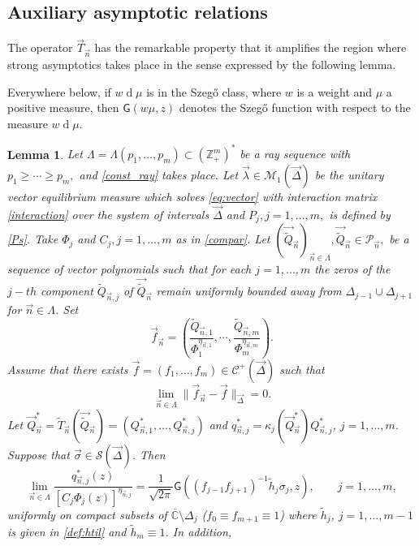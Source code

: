 \documentclass{amsart}
\numberwithin{equation}{section}
\newtheorem{lemma}[theorem]{Lemma}
\theoremstyle{definition}
\DeclareMathOperator{\D}{d}        %
\newcommand{\ZZ}{\mathbb{Z}}      %
\newcommand{\CC}{\mathbb{C}}      %
\newcommand{\n}{\vec{n}}          %
\begin{document}
\subsection{Auxiliary asymptotic relations}
The operator $\vec{T}_{\n}$ has the remarkable property that it amplifies the region where strong asymptotics takes place in the sense expressed by the following lemma.

Everywhere below, if $w \D \mu $ is in the Szeg\H{o} class, where $w$ is a weight and $\mu$ a positive measure, then
$\mathsf{G}(w\mu,z)$ denotes the Szeg\H{o} function with respect to the measure $w \D \mu$.

    \begin{lemma}
        \label{prop5}
        Let $\Lambda = \Lambda(p_1,\ldots,p_m) \subset (\ZZ_+^m)^*$ be a ray sequence with  $p_1 \geq \cdots \geq p_m,$ and \eqref{const_ray} takes place. Let $\vec{\lambda} \in \mathcal{M}_1(\vec{\Delta})$ be the unitary vector equilibrium measure which solves \eqref{eq:vector}  with interaction matrix \eqref{interaction} over the system of intervals $\vec{\Delta}$ and $P_j, j=1,\ldots,m,$ is defined by \eqref{Ps}. Take $\Phi_j$ and $C_j, j=1,\ldots,m$ as in \eqref{compar}. Let $(\vec{\tilde{Q}}_{\n})_{\n\in\Lambda}, \vec{\tilde{Q}}_{\n} \in \mathcal{P}_{\n},$ be a sequence of vector polynomials such that  for each $j=1,\ldots,m$ the zeros of the $j-th$ component $\tilde{Q}_{\n,j}$ of $\vec{\tilde{Q}}_{\n}$ remain uniformly bounded away from $\Delta_{j-1} \cup \Delta_{j+1}$ for $\n \in \Lambda$.   Set
        \[ \vec{f}_{\n} = \left(\frac{\tilde{Q}_{\n,1}}{\Phi_1^{\eta_{\n,1}}}, \cdots, \frac{\tilde{Q}_{\n,m}}{\Phi_m^{\eta_{\n,m}}}\right).
        \]
        Assume that there exists $\vec{f}=(f_1,\ldots,f_m)\in\mathcal{C}^+(\vec{\Delta})$  such that
        \begin{equation}
            \label{limden}
            \lim_{\n\in\Lambda} \|\vec{f}_{\n}-\vec{f}\|_{\vec{\Delta}} =0.
        \end{equation}
        Let $\vec{Q}_{\n}^* = \tilde{T}_{\n}(\vec{\tilde{Q}}_{\n}) = (Q_{\n,1}^*,\ldots,Q_{\n,j}^*)$ and   ${q}_{\n,j}^* =
        \kappa_j(\vec{Q}_{\n}^*) {Q}_{\n,j}^*$, $j=1,\ldots,m$. Suppose that  $\vec{\sigma}\in\mathcal{S}(\vec{\Delta})$. Then
        \[
            \lim_{\n\in\Lambda} \frac{q^*_{\n,j}(z)}{[C_j\Phi_j(z)]^{\eta_{\n,j}}} = \frac{1}{\sqrt{2\pi}}\mathsf{G}\left((f_{j-1}f_{j+1})^{-1}\tilde{h}_j\sigma_j,z\right), \qquad  j=1,\ldots,m,
        \]
        uniformly on compact subsets of $\overline{\CC}\setminus \Delta_j$ ($f_0\equiv f_{m+1}\equiv 1$) where $\tilde{h}_j$, $j=1,\ldots,m-1$ is given in \eqref{def:htil} and $\tilde{h}_m \equiv 1$. In addition,

\end{lemma}
\end{document}
